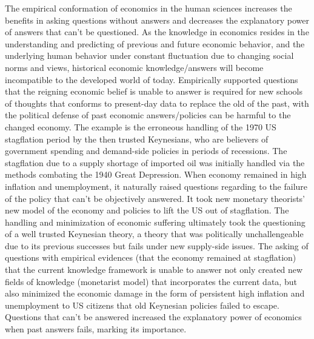 \documentclass[a4paper,12pt]{article}
\begin{document}
The empirical conformation of economics in the human sciences increases the benefits in asking questions without answers and decreases the explanatory power of answers that can’t be questioned. As the knowledge in economics resides in the understanding and predicting of previous and future economic behavior, and the underlying human behavior under constant fluctuation due to changing social norms and views, historical economic knowledge/answers will become incompatible to the developed world of today. Empirically supported questions that the reigning economic belief is unable to answer is required for new schools of thoughts that conforms to present-day data to replace the old of the past, with the political defense of past economic answers/policies can be harmful to the changed economy. The example is the erroneous handling of the 1970 US stagflation period by the then trusted Keynesians, who are believers of government spending and demand-side policies in periods of recessions. The stagflation due to a supply shortage of imported oil was initially handled via the methods combating the 1940 Great Depression. When economy remained in high inflation and unemployment, it naturally raised questions regarding to the failure of the policy that can’t be objectively answered. It took new monetary theorists’ new model of the economy and policies to lift the US out of stagflation. The handling and minimization of economic suffering ultimately took the questioning of a well trusted Keynesian theory, a theory that was politically unchallengeable due to its previous successes but fails under new supply-side issues. The asking of questions with empirical evidences (that the economy remained at stagflation) that the current knowledge framework is unable to answer not only created new fields of knowledge (monetarist model) that incorporates the current data, but also minimized the economic damage in the form of persistent high inflation and unemployment to US citizens that old Keynesian policies failed to escape. Questions that can’t be answered increased the explanatory power of economics when past answers fails, marking its importance.
\end{document}

